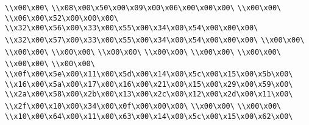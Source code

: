 \verb|\\x00\x00\|\newline
\verb|\\x08\x00\x50\x00\x09\x00\x06\x00\x00\x00\|\newline
\verb|\\x00\x00\|\newline
\verb|\\x06\x00\x52\x00\x00\x00\|\newline
\verb|\\x32\x00\x56\x00\x33\x00\x55\x00\x34\x00\x54\x00\x00\x00\|\newline
\verb|\\x32\x00\x57\x00\x33\x00\x55\x00\x34\x00\x54\x00\x00\x00\|\newline
\verb|\\x00\x00\|\newline
\verb|\\x00\x00\|\newline
\verb|\\x00\x00\|\newline
\verb|\\x00\x00\|\newline
\verb|\\x00\x00\|\newline
\verb|\\x00\x00\|\newline
\verb|\\x00\x00\|\newline
\verb|\\x00\x00\|\newline
\verb|\\x00\x00\|\newline
\verb|\\x0f\x00\x5e\x00\x11\x00\x5d\x00\x14\x00\x5c\x00\x15\x00\x5b\x00\|\newline
\verb|\\x16\x00\x5a\x00\x17\x00\x16\x00\x21\x00\x15\x00\x29\x00\x59\x00\|\newline
\verb|\\x2a\x00\x58\x00\x2b\x00\x13\x00\x2c\x00\x12\x00\x2d\x00\x11\x00\|\newline
\verb|\\x2f\x00\x10\x00\x34\x00\x0f\x00\x00\x00\|\newline
\verb|\\x00\x00\|\newline
\verb|\\x00\x00\|\newline
\verb|\\x10\x00\x64\x00\x11\x00\x63\x00\x14\x00\x5c\x00\x15\x00\x62\x00\|\newline
